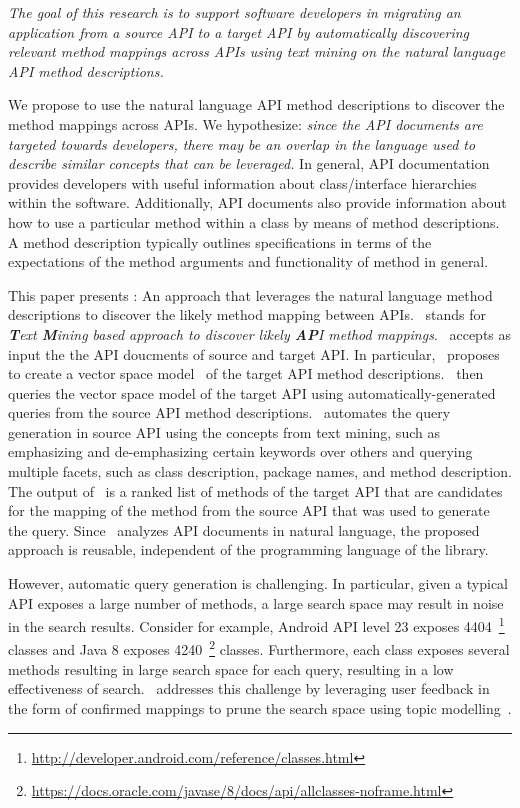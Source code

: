 \textit{The goal of this research is to support software developers 
	in migrating an application from a source API to a target API
	by automatically discovering relevant method mappings across APIs using text mining
	on the natural language API method descriptions.}

We propose to use the natural language API method descriptions
to discover the method mappings across APIs.
We hypothesize:
\textit{since the API documents are targeted towards developers,
	there may be an overlap in the language used to describe similar concepts that can be leveraged.}
In general, API documentation provides developers with useful information
about class/interface hierarchies within the software.
Additionally, API documents also provide information about
how to use a particular method within a class by means of method descriptions.
A method description typically outlines specifications in terms of
the expectations of the method arguments and functionality of method in general.


This paper presents \tool : An approach that leverages the natural language method descriptions to discover the likely method mapping between APIs.
\tool\ stands for \textit{\textbf{T}ext \textbf{M}ining
	based approach to discover likely \textbf{AP}I method mappings}.
\tool\ accepts as input the the API doucments of source and target API.
In particular, \tool\ proposes to create a vector space model~\cite{singhal2001modern,manning2008introduction} of the target API method descriptions. 
\tool\ then queries the vector space model of the target API using
automatically-generated queries from the source API method descriptions.
\tool\ automates the query generation in source API using the concepts from text mining, such as emphasizing and de-emphasizing certain keywords over others and querying multiple facets, such as class description, package names, and method description.
The output of \tool\ is a ranked list of methods of the target API that are candidates for the mapping of the method from the source API that was used to generate the query.
Since \tool\ analyzes API documents in natural language, the proposed approach is reusable, independent of the programming language of the library.


However, automatic query generation is challenging. In particular, given a typical API exposes a large number of methods, a large search space may result in noise in the search results.
Consider for example, Android API level 23 exposes 4404~\footnote{\url{http://developer.android.com/reference/classes.html}} classes
and Java 8 exposes 4240~\footnote{\url{https://docs.oracle.com/javase/8/docs/api/allclasses-noframe.html}} classes.
Furthermore, each class exposes several methods resulting in large search space for each query, resulting in a low effectiveness of search. 
\tool\ addresses this challenge by leveraging user feedback in the form of confirmed mappings to prune the search space using topic modelling~\cite{blei2003latent,panichella2013effectively}. 


